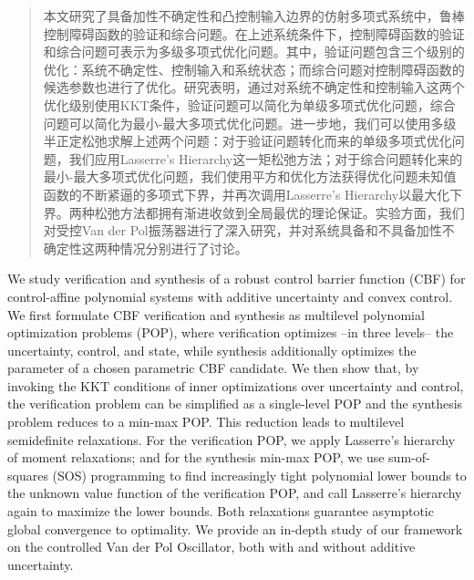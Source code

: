 

\begin{abstract}
  本文研究了具备加性不确定性和凸控制输入边界的仿射多项式系统中，鲁棒控制障碍函数的验证和综合问题。在上述系统条件下，控制障碍函数的验证和综合问题可表示为多级多项式优化问题。其中，验证问题包含三个级别的优化：系统不确定性、控制输入和系统状态；而综合问题对控制障碍函数的候选参数也进行了优化。研究表明，通过对系统不确定性和控制输入这两个优化级别使用KKT条件，验证问题可以简化为单级多项式优化问题，综合问题可以简化为最小-最大多项式优化问题。进一步地，我们可以使用多级半正定松弛求解上述两个问题：对于验证问题转化而来的单级多项式优化问题，我们应用Lasserre's Hierarchy这一矩松弛方法；对于综合问题转化来的最小-最大多项式优化问题，我们使用平方和优化方法获得优化问题未知值函数的不断紧逼的多项式下界，并再次调用Lasserre's Hierarchy以最大化下界。两种松弛方法都拥有渐进收敛到全局最优的理论保证。实验方面，我们对受控Van der Pol振荡器进行了深入研究，并对系统具备和不具备加性不确定性这两种情况分别进行了讨论。

\end{abstract}

\begin{abstract*}
  We study verification and synthesis of a robust control barrier function (CBF) for control-affine polynomial systems with additive uncertainty and convex control. We first formulate CBF verification and synthesis as multilevel polynomial optimization problems (POP), where verification  optimizes --in three levels-- the uncertainty, control, and state, while synthesis additionally optimizes the parameter of a chosen parametric CBF candidate. We then show that, by invoking the KKT conditions of inner optimizations over uncertainty and control, the verification problem can be simplified as a single-level POP and the synthesis problem reduces to a min-max POP. This reduction leads to multilevel semidefinite relaxations. 
  For the verification POP, we apply Lasserre's hierarchy of moment relaxations; and for the synthesis min-max POP, we use sum-of-squares (SOS) programming to find increasingly tight polynomial lower bounds to the unknown value function of the verification POP, and call Lasserre's hierarchy again to maximize the lower bounds. Both relaxations guarantee asymptotic global convergence to optimality. We provide an in-depth study of our framework on the controlled Van der Pol Oscillator, both with and without additive uncertainty.

\end{abstract*}
